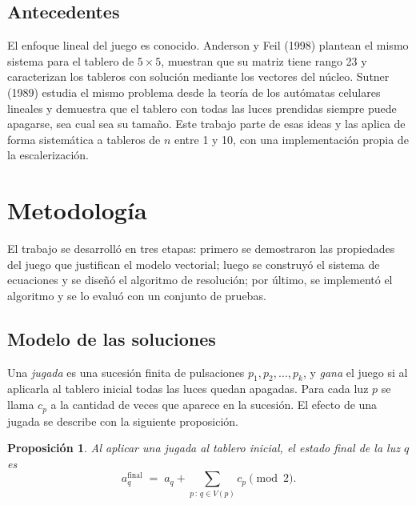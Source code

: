 \documentclass[12pt,a4paper]{article}
\theoremstyle{plain}
\newtheorem{proposicion}{Proposición}
\theoremstyle{definition}
\theoremstyle{remark}
\newcommand{\V}{V}
\begin{document}
\subsection{Antecedentes}

El enfoque lineal del juego es conocido. Anderson y Feil (1998) plantean el mismo sistema para el tablero de $5\times 5$, muestran que su matriz tiene rango 23 y caracterizan los tableros con solución mediante los vectores del núcleo. Sutner (1989) estudia el mismo problema desde la teoría de los autómatas celulares lineales y demuestra que el tablero con todas las luces prendidas siempre puede apagarse, sea cual sea su tamaño. Este trabajo parte de esas ideas y las aplica de forma sistemática a tableros de $n$ entre 1 y 10, con una implementación propia de la escalerización.

\section{Metodología}\label{sec:metodologia}

El trabajo se desarrolló en tres etapas: primero se demostraron las propiedades del juego que justifican el modelo vectorial; luego se construyó el sistema de ecuaciones y se diseñó el algoritmo de resolución; por último, se implementó el algoritmo y se lo evaluó con un conjunto de pruebas.

\subsection{Modelo de las soluciones}\label{sec:modelo}

Una \textit{jugada} es una sucesión finita de pulsaciones $p_1,p_2,\ldots,p_k$, y \textit{gana} el juego si al aplicarla al tablero inicial todas las luces quedan apagadas. Para cada luz $p$ se llama $c_p$ a la cantidad de veces que aparece en la sucesión. El efecto de una jugada se describe con la siguiente proposición.

\begin{proposicion}\label{prop:efecto}
Al aplicar una jugada al tablero inicial, el estado final de la luz $q$ es
\begin{equation}\label{eq:efecto}
a_q^{\text{final}} \;=\; a_q + \sum_{p\,:\,q\in\V(p)} c_p \pmod 2 .
\end{equation}
\end{proposicion}
\end{document}
